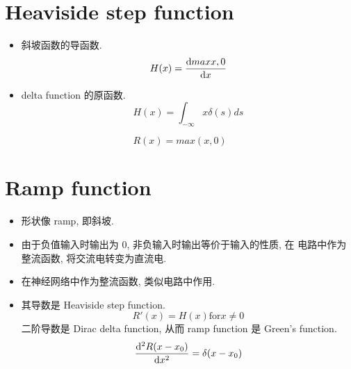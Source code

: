 \documentclass{article}
\begin{document}
\section{Heaviside step function}
\begin{itemize}
    \item 斜坡函数的导函数.
        \begin{equation}
            H(x) = \dv{max{x,0}}{x}
        \end{equation}
    \item delta function 的原函数.
        \begin{equation}
            H(x) = \int_{-\infty}{x}\delta(s)ds
        \end{equation}
\end{itemize}

\begin{equation}
    R(x) = max(x, 0)
\end{equation}

\section{Ramp function}
\begin{itemize}
    \item 形状像 ramp, 即斜坡.
    \item
        由于负值输入时输出为 0, 非负输入时输出等价于输入的性质, 在
        电路中作为整流函数, 将交流电转变为直流电.
    \item
        在神经网络中作为整流函数, 类似电路中作用.
    \item
        其导数是 Heaviside step function.
        \begin{equation}
            R'(x) = H(x) \text{for} x \ne 0
        \end{equation}
        二阶导数是 Dirac delta function, 从而 ramp function 是 Green's function.
        \begin{equation}
            \dv[2]{R(x-x_0)}{x} = \delta(x-x_0)
        \end{equation}
\end{itemize}
\end{document}
